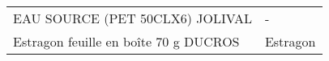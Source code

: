 \begin{longtable}{p{5cm}p{10cm}}
                                                                          EAU SOURCE (PET 50CLX6) JOLIVAL &                                                                                                                                                                                                                                                                                                                                                                                                                                                                                                                                                                                                                                                                                                                                                                                                                                                                                                                                                                                                                                        - \\
                                                                    Estragon feuille en boîte 70 g DUCROS &                                                                                                                                                                                                                                                                                                                                                                                                                                                                                                                                                                                                                                                                                                                                                                                                                                                                                                                                                                                                                                 Estragon \\

\end{longtable}
